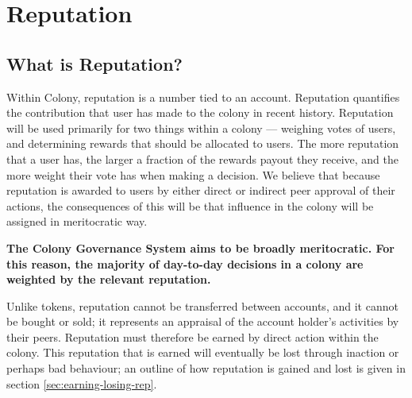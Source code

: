 \section{Reputation}\label{sec:reputation}
\subsection{What is Reputation?}\label{subsec:what-is-reputation}

Within Colony, reputation is a number tied to an account. Reputation quantifies the contribution that user has made to the colony in recent history. Reputation will be used primarily for two things within a colony --- weighing votes of users, and determining rewards that should be allocated to users. The more reputation that a user has, the larger a fraction of the rewards payout they receive, and the more weight their vote has when making a decision. We believe that because reputation is awarded to users by either direct or indirect peer approval of their actions, the consequences of this will be that influence in the colony will be assigned in meritocratic way.

\textbf{The Colony Governance System aims to be broadly meritocratic. For this reason, the majority of day-to-day decisions in a colony are weighted by the relevant reputation.} %

Unlike tokens, reputation cannot be transferred between accounts, and it cannot be bought or sold; it represents an appraisal of the account holder's activities by their peers. Reputation must therefore be earned by direct action within the colony. This reputation that is earned will eventually be lost through inaction or perhaps bad behaviour; an outline of how reputation is gained and lost is given in section \ref{sec:earning-losing-rep}. 



